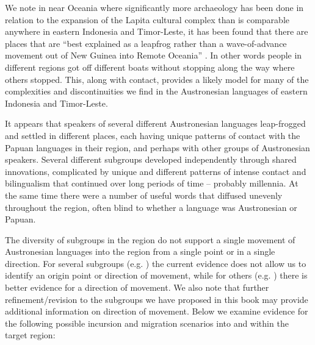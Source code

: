 We note in near Oceania where significantly more archaeology
has been done in relation to the expansion of the Lapita cultural
complex than is comparable anywhere in eastern Indonesia
and Timor-Leste, it has been found that there are places that
are “best explained as a leapfrog rather than a wave-of-advance
movement out of New Guinea into Remote Oceania” \citep{Sheppard2019}.
In other words people in different regions got off different
boats without stopping along the way where others stopped.
This, along with contact, provides a likely model for many of
the complexities and discontinuities we find in the Austronesian languages of
eastern Indonesia and Timor-Leste.

It appears that speakers of several different Austronesian languages
leap-frogged and settled in different places,
each having unique patterns of contact with the Papuan languages
in their region, and perhaps with other groups of Austronesian speakers.
Several different subgroups developed independently through shared
innovations, complicated by unique and different patterns of intense contact
and bilingualism that continued over long periods of time -- probably millennia.
At the same time there were a number of useful words that diffused
unevenly throughout the region,
often blind to whether a language was Austronesian or Papuan.

The diversity of subgroups in the region do not support a single
movement of Austronesian languages into the region from a single
point or in a single direction.
For several subgroups (e.g.
) the current evidence does not allow us to
identify an origin point or direction of movement,
while for others (e.g.
) there is better evidence for a direction of movement.
We also note that further refinement/revision to the subgroups
we have proposed in this book may provide additional information
on direction of movement.
Below we examine evidence for the following possible incursion
and migration scenarios into
and within the target region:


